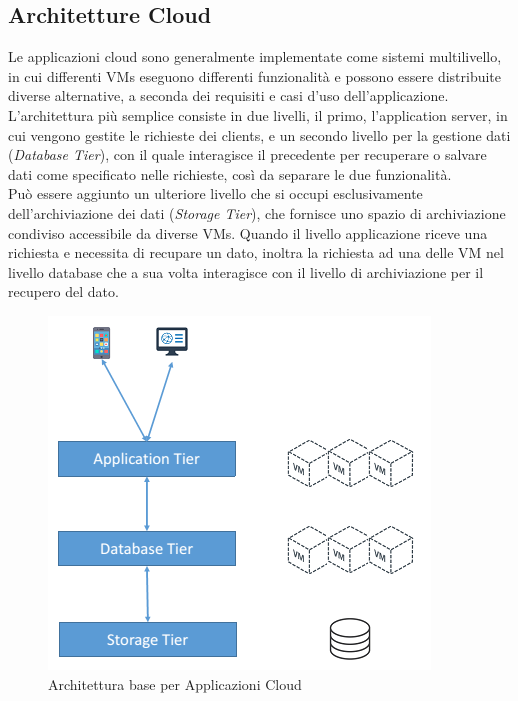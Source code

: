 \documentclass{article}
\begin{document}
\subsection{Architetture Cloud}
Le applicazioni cloud sono generalmente implementate come sistemi multilivello, in cui differenti VMs eseguono differenti funzionalità e possono essere distribuite diverse alternative, a seconda dei requisiti e casi d’uso dell’applicazione. 
L’architettura più semplice consiste in due livelli, il primo, l’application server, in cui vengono gestite le richieste dei clients, e un secondo livello per la gestione dati (\textit{Database Tier}), con il quale interagisce il precedente per recuperare o salvare dati come specificato nelle richieste, così da separare le due funzionalità. \\Può essere aggiunto un ulteriore livello che si occupi esclusivamente dell’archiviazione dei dati (\textit{Storage Tier}), che fornisce uno spazio di archiviazione condiviso accessibile da diverse VMs.
Quando il livello applicazione riceve una richiesta e necessita di recupare un dato, inoltra la richiesta ad una delle VM nel livello database che a sua volta interagisce con il livello di archiviazione per il recupero del dato.
\begin{figure}[H]
\centering
\includegraphics[scale=0.6]{img/base_arch.png}
\caption{Architettura base per Applicazioni Cloud}
\end{figure}
\end{document}
